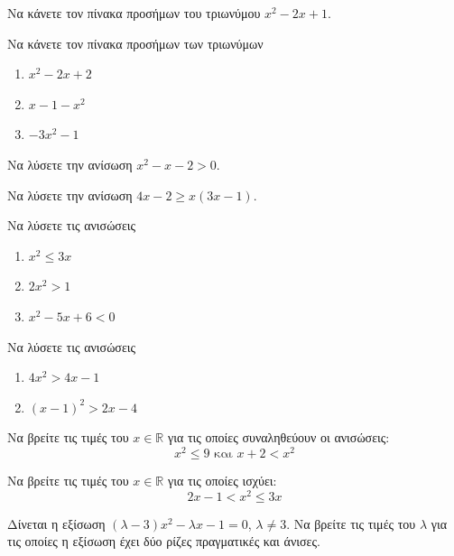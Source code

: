 \documentclass{presentation}
\begin{document}
\begin{askisi}
  Να κάνετε τον πίνακα προσήμων του τριωνύμου $x^2-2x+1$.
\end{askisi}

\begin{askisi}
  Να κάνετε τον πίνακα προσήμων των τριωνύμων
  \begin{enumerate}[<+->]
    \item $x^2-2x+2$
    \item $x-1-x^2$
    \item $-3x^2-1$
  \end{enumerate}
\end{askisi}

\begin{askisi}
  Να λύσετε την ανίσωση $x^2-x-2>0$.
\end{askisi}

\begin{askisi}
  Να λύσετε την ανίσωση $4x-2\ge x(3x-1)$.
\end{askisi}

\begin{askisi}
  Να λύσετε τις ανισώσεις
  \begin{enumerate}[<+->]
    \item $x^2\le 3x$
    \item $2x^2>1$
    \item $x^2-5x+6<0$
  \end{enumerate}
\end{askisi}

\begin{askisi}
  Να λύσετε τις ανισώσεις
  \begin{enumerate}[<+->]
    \item $4x^2>4x-1$
    \item $(x-1)^2>2x-4$
  \end{enumerate}
\end{askisi}

\begin{askisi}
  Να βρείτε τις τιμές του $x\in\mathbb{R}$ για τις οποίες συναληθεύουν οι ανισώσεις:
  $$x^2\le 9 \text{ και } x+2<x^2$$
\end{askisi}

\begin{askisi}
  Να βρείτε τις τιμές του $x\in\mathbb{R}$ για τις οποίες ισχύει:
  $$2x-1<x^2\le 3x$$
\end{askisi}

\begin{askisi}
  Δίνεται η εξίσωση $(λ-3)x^2-λx-1=0$, $λ\ne 3$. Να βρείτε τις τιμές του $λ$ για τις οποίες η εξίσωση έχει δύο ρίζες πραγματικές και άνισες.
\end{askisi}
\end{document}
